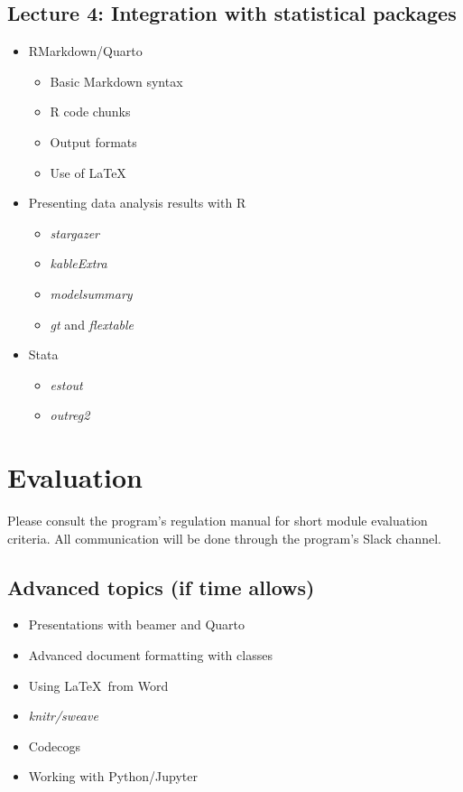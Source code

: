 \documentclass[a4paper,12pt]{article}
\begin{document}
\subsection{Lecture 4: Integration with statistical packages}

\begin{itemize}
    \item RMarkdown/Quarto
    \begin{itemize}
        \item Basic Markdown syntax
        \item R code chunks
        \item Output formats
        \item Use of \LaTeX
    \end{itemize}
    \item Presenting data analysis results with R
    \begin{itemize}
        \item \textit{stargazer}
        \item \textit{kableExtra}
        \item \textit{modelsummary}
        \item \textit{gt} and \textit{flextable}
    \end{itemize}
    \item Stata
    \begin{itemize}
        \item \textit{estout}
        \item \textit{outreg2}
    \end{itemize}
\end{itemize}

\section{Evaluation}

Please consult the program's regulation manual for short module evaluation criteria. All communication will be done through the program's Slack channel.


\subsection{Advanced topics (if time allows)}

\begin{itemize}
    \item Presentations with beamer and Quarto
    \item Advanced document formatting with classes
    \item Using \LaTeX \ from Word
    \item \textit{knitr/sweave}
    \item Codecogs
    \item Working with Python/Jupyter
\end{itemize}

\renewcommand\bibname{Reference Material}
\printbibliography
\end{document}

